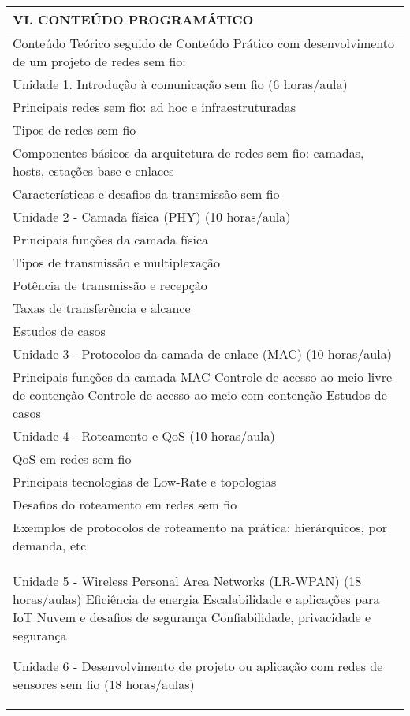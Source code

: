 \documentclass[12pt]{article}
\begin{document}
\begin{longtable}{|L{1.025\textwidth}|} \hline
%
{\bf VI. CONTEÚDO PROGRAMÁTICO } \\ \hline
Conteúdo Teórico seguido de Conteúdo Prático com desenvolvimento de um projeto de redes sem fio: \\
Unidade 1. Introdução à comunicação sem fio (6 horas/aula)\\
 Principais redes sem fio: ad hoc e infraestruturadas\\
 Tipos de redes sem fio\\
 Componentes básicos da arquitetura de redes sem fio: camadas, hosts, estações base e enlaces\\
 Características e desafios da transmissão sem fio\\

 Unidade 2 - Camada física (PHY) (10 horas/aula)\\
 Principais funções da camada física\\
 Tipos de transmissão e multiplexação\\
 Potência de transmissão e recepção\\
 Taxas de transferência e alcance\\
 Estudos de casos\\

 Unidade 3 - Protocolos da camada de enlace (MAC) (10 horas/aula)\\
 Principais funções da camada MAC
 Controle de acesso ao meio livre de contenção
 Controle de acesso ao meio com contenção
 Estudos de casos
\\
Unidade 4 - Roteamento e QoS (10 horas/aula)\\
 QoS em redes sem fio\\
 Principais tecnologias de Low-Rate e topologias\\
 Desafios do roteamento em redes sem fio\\
 Exemplos de protocolos de roteamento na prática: hierárquicos, por demanda, etc\\

Unidade 5 - Wireless Personal Area Networks (LR-WPAN) (18 horas/aulas)
  Eficiência de energia
  Escalabilidade e aplicações para IoT
  Nuvem e desafios de segurança
  Confiabilidade, privacidade e segurança 

 Unidade 6 - Desenvolvimento de projeto ou aplicação com redes de sensores sem fio (18 horas/aulas)



\\ \hline
\end{longtable} 
\end{document}
